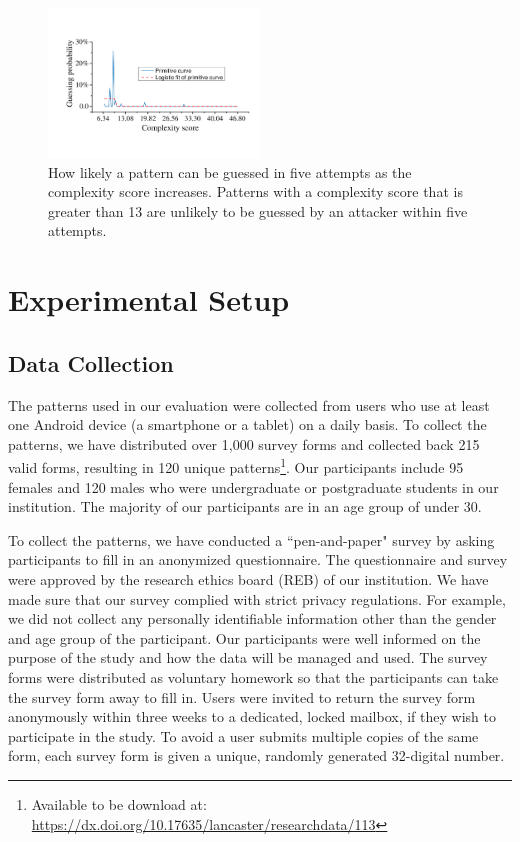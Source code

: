 
        \begin{figure}[!t]
            \centering
            \includegraphics[width=0.5\textwidth]{fig/guess_prob.pdf}
            \caption{How likely a pattern can be guessed in five attempts as the complexity score increases. Patterns with a complexity score that is greater than 13 are
             unlikely to be guessed by an attacker within five attempts.}
            \label{fig:guessing-probability}
        \end{figure}

\section{Experimental Setup \label{sec:setup}}
    \subsection{Data Collection}
    \label{section:locking patterns}
    The patterns used in our evaluation were collected from users who use at least one Android device (a smartphone or a tablet) on a daily basis.
    To collect the patterns, we have distributed over 1,000 survey forms and collected back 215 valid forms, resulting in 120 unique patterns\footnote{Available to be download at: \url{https://dx.doi.org/10.17635/lancaster/researchdata/113}}.
    Our participants include 95 females and 120 males who were undergraduate or postgraduate students in our institution.
    The majority of our participants are in an age group of under 30.


    To collect the patterns, we have conducted a ``pen-and-paper" survey by asking participants to fill in an anonymized questionnaire.
    The questionnaire and survey were approved by the research ethics board (REB) of our institution.
    We have made sure that our survey complied with strict privacy regulations. For example, we did not collect any personally identifiable information other than the gender and age group of the participant. Our participants were well informed on the purpose
    of the study and how the data will be managed and used. The survey forms were distributed as voluntary homework so that the participants can take the survey form away to fill in.
     Users were invited to return the survey form anonymously within three weeks to a dedicated, locked mailbox, if they wish to participate in the study.
     To avoid a user submits multiple copies of the same form, each survey form is given a unique, randomly generated 32-digital number.


